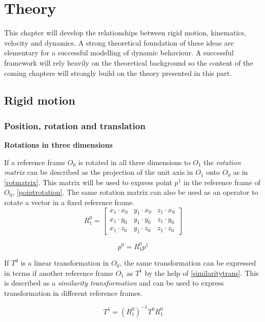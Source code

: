 \chapter{Theory}
This chapter will develop the relationships between rigid motion, kinematics, velocity and dynamics. A strong theoretical foundation of these ideas are elementary for a successful modelling of dynamic behaviour. A successful framework will rely heavily on the theoretical background so the content of the coming chapters will strongly build on the theory presented in this part.

\section{Rigid motion}
\subsection{Position, rotation and translation}
\textbf{Rotations in three dimensions}

\noindent If a reference frame $O_0$ is rotated in all three dimensions to $O_1$ the \textit{rotation matrix} can be described as the projection of the unit axis in $O_1$ onto $O_0$ as in \eqref{rotmatrix}. This matrix will be used to express point $p^1$ in the reference frame of $O_0$, \eqref{pointrotation}. The same rotation matrix can also be used as an operator to rotate a vector in a fixed reference frame.
\begin{equation}\label{rotmatrix}
R^0_1=\begin{bmatrix}
x_1\cdot x_0 & y_1\cdot x_0 & z_1\cdot x_0\\ 
x_1\cdot y_0 & y_1\cdot y_0 & z_1\cdot y_0\\ 
x_1\cdot z_0 & y_1\cdot z_0 & z_1\cdot z_0
\end{bmatrix}
\end{equation}

\begin{equation}\label{pointrotation}
p^0 = R^0_1p^1
\end{equation}

If $T^0$ is a linear transformation in $O_0$, the same transformation can be expressed in terms if another reference frame $O_1$ as $T^1$ by the help of \eqref{similaritytrans}. This is described as a \textit{similarity transformation} and can be used to express transformation in different reference frames.

\begin{equation}\label{similaritytrans}
T^1 = (R^0_1)^{-1}T^0 R^0_1
\end{equation}
